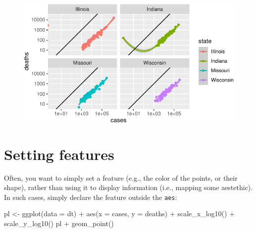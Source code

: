 \documentclass[
  letterpaper,
  DIV=11,
  numbers=noendperiod]{scrreprt}
\newenvironment{Shaded}{\begin{snugshade}}{\end{snugshade}}
\newcommand{\AttributeTok}[1]{\textcolor[rgb]{0.40,0.45,0.13}{#1}}
\newcommand{\FunctionTok}[1]{\textcolor[rgb]{0.28,0.35,0.67}{#1}}
\newcommand{\NormalTok}[1]{\textcolor[rgb]{0.00,0.23,0.31}{#1}}
\newcommand{\OtherTok}[1]{\textcolor[rgb]{0.00,0.23,0.31}{#1}}
\newcommand{\SpecialCharTok}[1]{\textcolor[rgb]{0.37,0.37,0.37}{#1}}
\begin{document}
\begin{figure}[H]

{\centering \includegraphics{./01-dataviz_files/figure-pdf/unnamed-chunk-24-1.pdf}

}

\end{figure}

\hypertarget{setting-features}{%
\section{Setting features}\label{setting-features}}

Often, you want to simply set a feature (e.g., the color of the points,
or their shape), rather than using it to display information (i.e.,
mapping some aestethic). In such cases, simply declare the feature
outside the \texttt{aes}:

\begin{Shaded}
\begin{Highlighting}[]
\NormalTok{pl }\OtherTok{\textless{}{-}} \FunctionTok{ggplot}\NormalTok{(}\AttributeTok{data =}\NormalTok{ dt) }\SpecialCharTok{+} 
  \FunctionTok{aes}\NormalTok{(}\AttributeTok{x =}\NormalTok{ cases, }\AttributeTok{y =}\NormalTok{ deaths) }\SpecialCharTok{+} 
  \FunctionTok{scale\_x\_log10}\NormalTok{() }\SpecialCharTok{+} 
  \FunctionTok{scale\_y\_log10}\NormalTok{()}
\NormalTok{pl }\SpecialCharTok{+} \FunctionTok{geom\_point}\NormalTok{()}
\end{Highlighting}
\end{Shaded}
\end{document}
